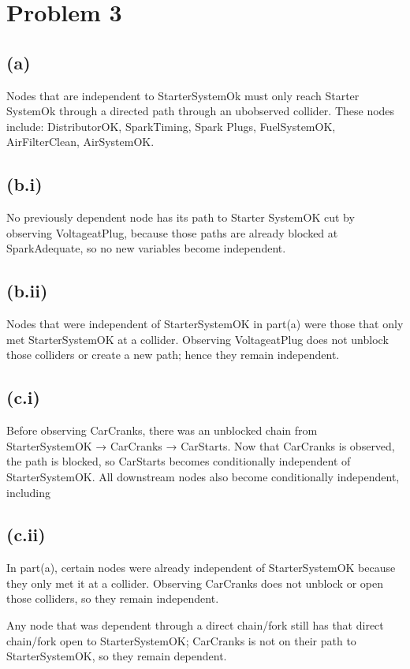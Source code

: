 \documentclass[11pt]{article}
\begin{document}
\newpage

\section*{Problem 3}
\subsection*{(a)}
Nodes that are independent to StarterSystemOk must only reach Starter SystemOk through a directed path through an ubobserved collider.
These nodes include: DistributorOK, SparkTiming, Spark Plugs, FuelSystemOK, AirFilterClean, AirSystemOK. 

\subsection*{(b.i)}
No previously dependent node has its path to Starter SystemOK cut by observing VoltageatPlug, 
because those paths are already blocked at SparkAdequate, so no new variables become independent.

\subsection*{(b.ii)}
Nodes that were independent of StarterSystemOK in part(a) were those that only met StarterSystemOK at a collider. 
Observing VoltageatPlug does not unblock those colliders or create a new path; hence they remain independent.

\subsection*{(c.i)}
Before observing CarCranks, there was an unblocked chain from StarterSystemOK → CarCranks → CarStarts. 
Now that CarCranks is observed, the path is blocked, so CarStarts becomes conditionally independent of StarterSystemOK.
All downstream nodes also become conditionally independent, including 
\subsection*{(c.ii)}
In part(a), certain nodes were already independent of StarterSystemOK because they only met it at a collider. 
Observing CarCranks does not unblock or open those colliders, so they remain independent.

Any node that was dependent through a direct chain/fork still has that direct chain/fork open to StarterSystemOK; 
CarCranks is not on their path to StarterSystemOK, so they remain dependent.
\end{document}
